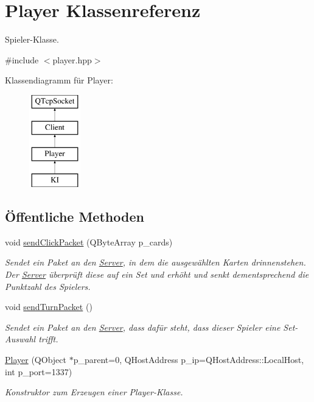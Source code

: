 \hypertarget{class_player}{}\section{Player Klassenreferenz}
\label{class_player}


Spieler-\/\+Klasse.  




{\ttfamily \#include $<$player.\+hpp$>$}

Klassendiagramm für Player\+:\begin{figure}[H]
\begin{center}
\leavevmode
\includegraphics[height=4.000000cm]{class_player}
\end{center}
\end{figure}
\subsection*{Öffentliche Methoden}
\begin{DoxyCompactItemize}
\item 
void \hyperlink{class_player_ae688e0cb60be7901e195d7881b4d39ce}{send\+Click\+Packet} (Q\+Byte\+Array p\+\_\+cards)
\begin{DoxyCompactList}\small\item\em Sendet ein Paket an den \hyperlink{class_server}{Server}, in dem die ausgewählten Karten drinnenstehen.~\newline
 Der \hyperlink{class_server}{Server} überprüft diese auf ein Set und erhöht und senkt dementsprechend die Punktzahl des Spielers. \end{DoxyCompactList}\item 
void \hyperlink{class_player_a08220f4cd6aa057071371a7c815a63dd}{send\+Turn\+Packet} ()
\begin{DoxyCompactList}\small\item\em Sendet ein Paket an den \hyperlink{class_server}{Server}, dass dafür steht, dass dieser Spieler eine Set-\/\+Auswahl trifft. \end{DoxyCompactList}\item 
\hyperlink{class_player_af07248b94d3f4ad62841d6dae90f5def}{Player} (Q\+Object $\ast$p\+\_\+parent=0, Q\+Host\+Address p\+\_\+ip=Q\+Host\+Address\+::\+Local\+Host, int p\+\_\+port=1337)
\begin{DoxyCompactList}\small\item\em Konstruktor zum Erzeugen einer Player-\/\+Klasse. \end{DoxyCompactList}\end{DoxyCompactItemize}
